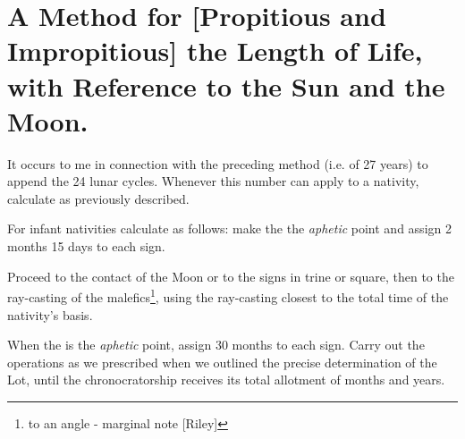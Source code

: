 \section{A Method for [Propitious and Impropitious] the Length of Life, with Reference to the Sun and the Moon.}

It occurs to me in connection with the preceding method (i.e. of 27 years) to append the 24 lunar cycles. Whenever this number can apply to a nativity, calculate as previously described. 

For infant nativities calculate as follows: make the \Moon\xspace the \textit{aphetic} point and assign 2 months 15 days to each sign.

Proceed to the contact of the Moon or to the signs in trine or square, then to the ray-casting of the malefics\footnote{to an angle - marginal note [Riley]}, using the ray-casting closest to the total time of the nativity’s basis. 

When the \Sun\xspace is the \textit{aphetic} point, assign 30 months to each sign. Carry out the operations as we prescribed when we outlined
the precise determination of the Lot, until the chronocratorship receives its total allotment of months and years.

\newpage